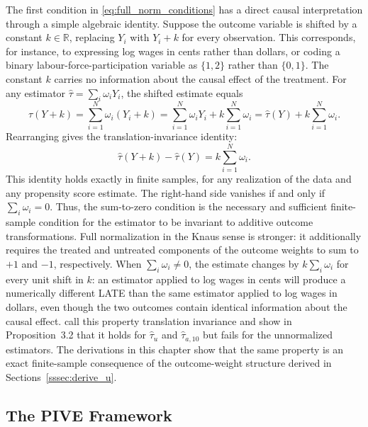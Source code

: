 \documentclass[12pt, a4paper, oneside]{article}
\theoremstyle{plain}
\theoremstyle{definition}
\begin{document}
The first condition in \eqref{eq:full_norm_conditions} has a direct causal
interpretation through a simple algebraic identity. Suppose the outcome variable is
shifted by a constant $k \in \mathbb{R}$, replacing $Y_i$ with $Y_i + k$ for every
observation. This corresponds, for instance, to expressing log wages in cents rather
than dollars, or coding a binary labour-force-participation variable as $\{1,2\}$
rather than $\{0,1\}$. The constant $k$ carries no information about the causal
effect of the treatment. For any estimator $\hat\tau = \sum_i \omega_i Y_i$, the
shifted estimate equals
\begin{equation}
  \hat\tau(Y + k)
  = \sum_{i=1}^N \omega_i (Y_i + k)
  = \sum_{i=1}^N \omega_i Y_i + k \sum_{i=1}^N \omega_i
  = \hat\tau(Y) + k \sum_{i=1}^N \omega_i.
  \label{eq:ti_algebra}
\end{equation}
Rearranging gives the translation-invariance identity:
\begin{equation}
  \hat\tau(Y + k) - \hat\tau(Y) = k \sum_{i=1}^N \omega_i.
  \label{eq:ti_identity}
\end{equation}
This identity holds exactly in finite samples, for any realization of the data and
any propensity score estimate. The right-hand side vanishes if and only if
$\sum_i \omega_i = 0$. 
Thus, the sum-to-zero condition is the necessary and sufficient finite-sample
condition for the estimator to be invariant to additive outcome transformations.
Full normalization in the Knaus sense is stronger: it additionally requires the
treated and untreated components of the outcome weights to sum to $+1$ and $-1$,
respectively.
When $\sum_i \omega_i \neq 0$, the
estimate changes by $k \sum_i \omega_i$ for every unit shift in $k$: an estimator
applied to log wages in cents will produce a numerically different LATE than the
same estimator applied to log wages in dollars, even though the two outcomes contain
identical information about the causal effect. \citet{sloczynski2025abadie} call this
property translation invariance and show in Proposition~3.2 that it holds for
$\hat\tau_u$ and $\hat\tau_{a,10}$ but fails for the unnormalized estimators. The
derivations in this chapter show that the same property is an exact finite-sample
consequence of the outcome-weight structure derived in
Sections~\ref{sssec:derive_u}.


\subsection{The PIVE Framework}
\label{subsec:pive_recap}
 
\end{document}
